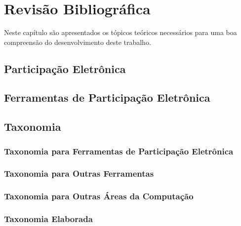 \chapter[Revisão Bibliográfica]{Revisão Bibliográfica} 
\label{cap:cap2}
Neste capítulo são apresentados os tópicos teóricos necessários para uma boa compreensão do desenvolvimento deste trabalho.

\section{Participação Eletrônica}
\label{sec:e-part}

\section{Ferramentas de Participação Eletrônica}
\label{sec:e-part tools}

\section{Taxonomia}
\label{sec:taxonomia}

\subsection{Taxonomia para Ferramentas de Participação Eletrônica}
\label{subsec:taxonomia e-part tools}

\subsection{Taxonomia para Outras Ferramentas}
\label{subsec:taxonomia other tools}

\subsection{Taxonomia para Outras Áreas da Computação}
\label{subsec:taxonomia other computer areas}

\subsection{Taxonomia Elaborada}
\label{subsec:taxonmia made}